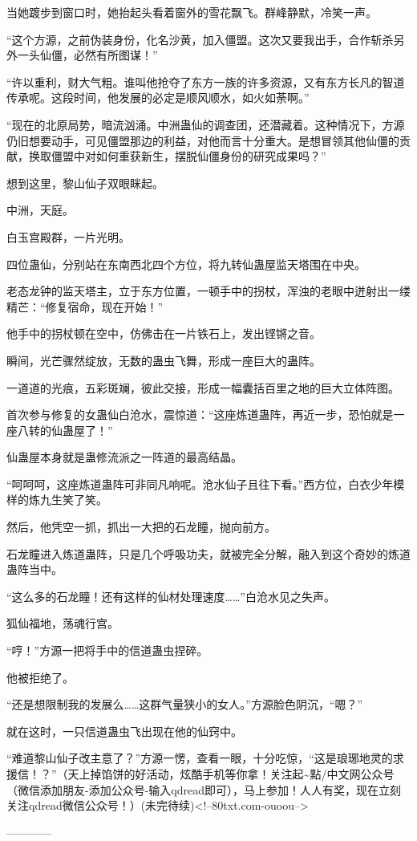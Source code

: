 \begin{this_body}
当她踱步到窗口时，她抬起头看着窗外的雪花飘飞。群峰静默，冷笑一声。

“这个方源，之前伪装身份，化名沙黄，加入僵盟。这次又要我出手，合作斩杀另外一头仙僵，必然有所图谋！”

“许以重利，财大气粗。谁叫他抢夺了东方一族的许多资源，又有东方长凡的智道传承呢。这段时间，他发展的必定是顺风顺水，如火如荼啊。”

“现在的北原局势，暗流汹涌。中洲蛊仙的调查团，还潜藏着。这种情况下，方源仍旧想要动手，可见僵盟那边的利益，对他而言十分重大。是想冒领其他仙僵的贡献，换取僵盟中对如何重获新生，摆脱仙僵身份的研究成果吗？”

想到这里，黎山仙子双眼眯起。

中洲，天庭。

白玉宫殿群，一片光明。

四位蛊仙，分别站在东南西北四个方位，将九转仙蛊屋监天塔围在中央。

老态龙钟的监天塔主，立于东方位置，一顿手中的拐杖，浑浊的老眼中迸射出一缕精芒：“修复宿命，现在开始！”

他手中的拐杖顿在空中，仿佛击在一片铁石上，发出铿锵之音。

瞬间，光芒骤然绽放，无数的蛊虫飞舞，形成一座巨大的蛊阵。

一道道的光痕，五彩斑斓，彼此交接，形成一幅囊括百里之地的巨大立体阵图。

首次参与修复的女蛊仙白沧水，震惊道：“这座炼道蛊阵，再近一步，恐怕就是一座八转的仙蛊屋了！”

仙蛊屋本身就是蛊修流派之一阵道的最高结晶。

“呵呵呵，这座炼道蛊阵可非同凡响呢。沧水仙子且往下看。”西方位，白衣少年模样的炼九生笑了笑。

然后，他凭空一抓，抓出一大把的石龙瞳，抛向前方。

石龙瞳进入炼道蛊阵，只是几个呼吸功夫，就被完全分解，融入到这个奇妙的炼道蛊阵当中。

“这么多的石龙瞳！还有这样的仙材处理速度……”白沧水见之失声。

狐仙福地，荡魂行宫。

“哼！”方源一把将手中的信道蛊虫捏碎。

他被拒绝了。

“还是想限制我的发展么……这群气量狭小的女人。”方源脸色阴沉，“嗯？”

就在这时，一只信道蛊虫飞出现在他的仙窍中。

“难道黎山仙子改主意了？”方源一愣，查看一眼，十分吃惊，“这是琅琊地灵的求援信！？”（天上掉馅饼的好活动，炫酷手机等你拿！关注起\~{}點/中文网公众号（微信添加朋友-添加公众号-输入qdread即可），马上参加！人人有奖，现在立刻关注qdread微信公众号！）(未完待续)<!--80txt.com-ouoou-->

------------

\end{this_body}

